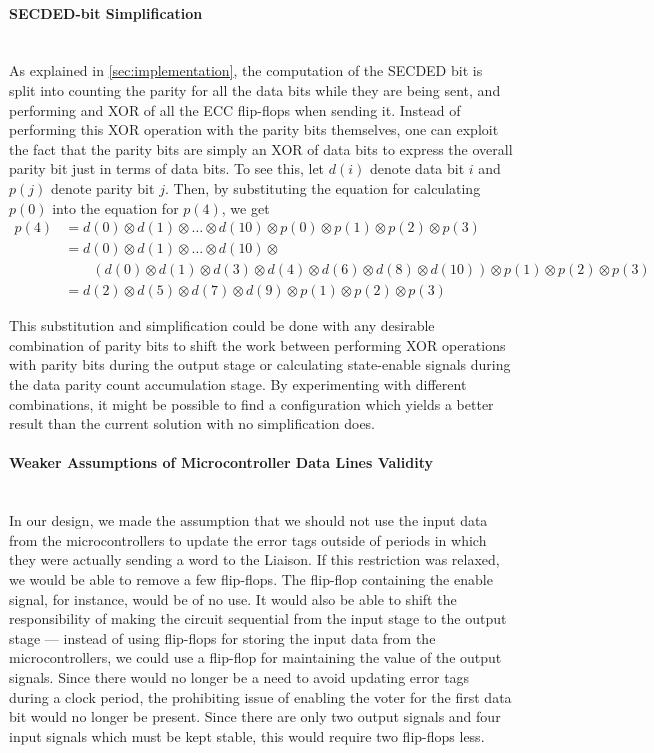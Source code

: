 \paragraph{SECDED-bit Simplification} \hfill \\
As explained in \autoref{sec:implementation}, the computation of the
SECDED bit is split into counting the parity for all the data bits
while they are being sent, and performing and XOR of all the ECC
flip-flops when sending it. Instead of performing this XOR operation
with the parity bits themselves, one can exploit the fact that the
parity bits are simply an XOR of data bits to express the overall
parity bit just in terms of data bits. To see this, let $d(i)$ denote
data bit $i$ and $p(j)$ denote parity bit $j$.  Then, by substituting
the equation for calculating $p(0)$ into the equation for $p(4)$, we
get
\begin{align*}
  p(4) &= d(0) \otimes d(1) \otimes \ldots \otimes d(10) \otimes p(0) \otimes p(1) \otimes p(2) \otimes p(3) \\
  &= d(0) \otimes d(1) \otimes \ldots \otimes d(10) \otimes \\
  & \qquad (d(0) \otimes d(1) \otimes d(3) \otimes d(4) \otimes d(6)
  \otimes d(8) \otimes d(10)) \otimes p(1) \otimes p(2) \otimes p(3) \\
  &= d(2) \otimes d(5) \otimes d(7) \otimes d(9) \otimes p(1) \otimes p(2) \otimes p(3)
\end{align*}

This substitution and simplification could be done with any desirable
combination of parity bits to shift the work between performing XOR
operations with parity bits during the output stage or calculating
state-enable signals during the data parity count accumulation
stage. By experimenting with different combinations, it might be
possible to find a configuration which yields a better
result than the current solution with no simplification does. 

\paragraph{Weaker Assumptions of Microcontroller Data Lines Validity} \hfill \\
In our design, we made the assumption that we should not use the input
data from the microcontrollers to update the error tags outside of
periods in which they were actually sending a word to the Liaison. If
this restriction was relaxed, we would be able to remove a few
flip-flops. The flip-flop containing the enable signal, for instance,
would be of no use. It would also be able to shift the responsibility
of making the circuit sequential from the input stage to the output
stage --- instead of using flip-flops for storing the input data from
the microcontrollers, we could use a flip-flop for maintaining the
value of the output signals. Since there would no longer be a need to
avoid updating error tags during a clock period, the prohibiting issue
of enabling the voter for the first data bit would no longer be
present. Since there are only two output signals and four input
signals which must be kept stable, this would require two flip-flops
less.


